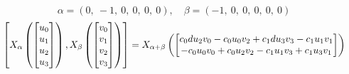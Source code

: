 \documentclass[11pt]{article}
\theoremstyle{definition}
\begin{document}
\[
\alpha = \left( 0, \  -1, \  0, \  0, \  0, \  0\right), \quad \beta = \left( -1, \  0, \  0, \  0, \  0, \  0\right)
\]
\[
\scaletoalign{\textwidth}{\left[ X_{\alpha}\left(\left[\begin{matrix}u_{0}\\u_{1}\\u_{2}\\u_{3}\end{matrix}\right]\right), X_{\beta}\left(\left[\begin{matrix}v_{0}\\v_{1}\\v_{2}\\v_{3}\end{matrix}\right]\right) \right] = X_{\alpha + \beta}\left(\left[\begin{matrix}c_{0} d u_{2} v_{0} - c_{0} u_{0} v_{2} + c_{1} d u_{3} v_{3} - c_{1} u_{1} v_{1}\\- c_{0} u_{0} v_{0} + c_{0} u_{2} v_{2} - c_{1} u_{1} v_{3} + c_{1} u_{3} v_{1}\end{matrix}\right]\right)}
\]
\end{document}
